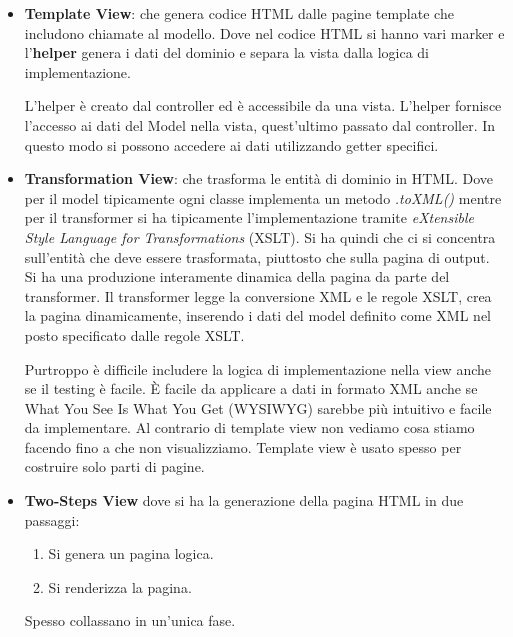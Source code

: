 \begin{itemize}
      \item \textbf{Template View}: che genera codice HTML dalle pagine template
            che includono chiamate al modello. Dove nel codice HTML si hanno vari
            marker e l'\textbf{helper} genera i dati del dominio e separa la vista
            dalla logica di implementazione.

            L'helper è creato dal controller ed è accessibile da una vista. L'helper
            fornisce l'accesso ai dati del Model nella vista, quest'ultimo passato
            dal controller. In questo modo si possono accedere ai dati utilizzando
            getter specifici.
      \item \textbf{Transformation View}: che trasforma le entità di dominio in
            HTML. Dove per il model tipicamente ogni classe implementa un metodo
            \textit{.toXML()} mentre per il transformer si ha tipicamente
            l'implementazione tramite \textit{eXtensible Style Language for
                  Transformations} (XSLT). Si ha quindi che ci si concentra
            sull'entità che deve essere trasformata, piuttosto che sulla pagina
            di output. Si ha una produzione interamente dinamica della pagina da
            parte del transformer. Il transformer legge la conversione XML e le
            regole XSLT, crea la pagina dinamicamente, inserendo i dati del model
            definito come XML nel posto specificato dalle regole XSLT.

            Purtroppo è difficile includere la logica di implementazione nella
            view anche se il testing è facile. È facile da applicare a dati in
            formato XML anche se What You See Is What You Get (WYSIWYG) sarebbe
            più intuitivo e facile da implementare. Al contrario di template view
            non vediamo cosa stiamo facendo fino a che non visualizziamo.
            Template view è usato spesso per costruire solo parti di pagine.
      \item \textbf{Two-Steps View} dove si ha la generazione della pagina HTML
            in due passaggi:
            \begin{enumerate}
                  \item Si genera un pagina logica.
                  \item Si renderizza la pagina.
            \end{enumerate}
            Spesso collassano in un'unica fase.


\end{itemize}
